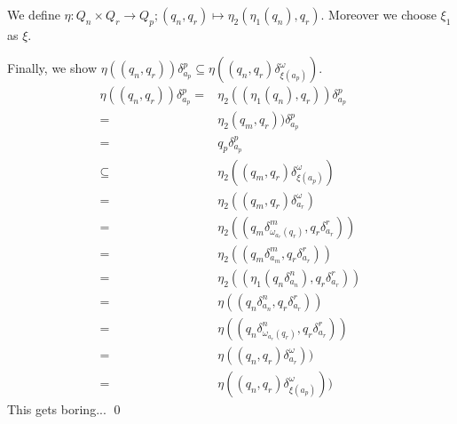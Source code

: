 \documentclass[a4paper,12pt,numbers=noenddot]{scrreport}
\begin{document}
We define $\eta : Q_n \times Q_r \rightarrow Q_p; (q_n, q_r) \mapsto \eta_2(\eta_1(q_n), q_r)$.
Moreover we choose $\xi_1$ as $\xi$.

Finally, we show $\eta((q_n,q_r))\delta^p_{a_p} \subseteq \eta((q_n, q_r) \delta^\omega_{\xi(a_p)})$.
\begin{align*}
    \eta((q_n,q_r))\delta^p_{a_p} = & \eta_2((\eta_1 (q_n),q_r))\delta^p_{a_p} \tag{def. $\eta, \eta_1$} \\
                      = & \eta_2(q_m,q_r))\delta^p_{a_p} \tag{def. $\eta_2$} \\
                      = & q_p\delta^p_{a_p} \tag{$P \leq M \omega R$} \\
                      \subseteq & \eta_2((q_m, q_r) \delta^\omega_{\xi(a_p)}) \tag{def. $\xi$}\\
                      = & \eta_2((q_m, q_r) \delta^\omega_{a_r}) \tag{def. $\delta^\omega$}\\
                      = & \eta_2((q_m \delta^m_{\omega_{a_r}(q_r)}, q_r \delta^r_{a_r})) \tag{def. $\omega$}\\
                      = & \eta_2((q_m \delta^m_{a_m}, q_r \delta^r_{a_r})) \tag{$M \leq N$}\\
                      = & \eta_2((\eta_1(q_n \delta^n_{a_n}), q_r \delta^r_{a_r})) \tag{def. $\eta$}\\
                      = & \eta((q_n \delta^n_{a_n}, q_r \delta^r_{a_r})) \tag{def. $\omega$}\\
                      = & \eta((q_n \delta^n_{\omega_{a_r}(q_r)}, q_r \delta^r_{a_r})) \tag{def. $\delta^\omega$}\\
                      = & \eta((q_n, q_r) \delta^\omega_{a_r})) \tag{def. $\xi$}\\
                      = & \eta((q_n, q_r) \delta^\omega_{\xi(a_p)}))
\end{align*}
This gets boring...
\qed
\section{}
\end{document}
